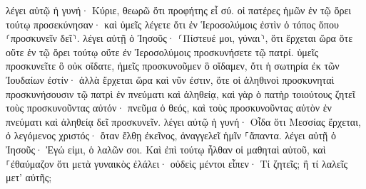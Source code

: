 \documentclass{openreader}
\begin{document}
λέγει αὐτῷ ἡ γυνή· Κύριε, θεωρῶ ὅτι προφήτης εἶ σύ. 
οἱ πατέρες ἡμῶν ἐν τῷ ὄρει τούτῳ προσεκύνησαν· καὶ ὑμεῖς λέγετε ὅτι ἐν Ἱεροσολύμοις ἐστὶν ὁ τόπος ὅπου ⸂προσκυνεῖν δεῖ⸃. 
λέγει αὐτῇ ὁ Ἰησοῦς· ⸂Πίστευέ μοι, γύναι⸃, ὅτι ἔρχεται ὥρα ὅτε οὔτε ἐν τῷ ὄρει τούτῳ οὔτε ἐν Ἱεροσολύμοις προσκυνήσετε τῷ πατρί. 
ὑμεῖς προσκυνεῖτε ὃ οὐκ οἴδατε, ἡμεῖς προσκυνοῦμεν ὃ οἴδαμεν, ὅτι ἡ σωτηρία ἐκ τῶν Ἰουδαίων ἐστίν· 
ἀλλὰ ἔρχεται ὥρα καὶ νῦν ἐστιν, ὅτε οἱ ἀληθινοὶ προσκυνηταὶ προσκυνήσουσιν τῷ πατρὶ ἐν πνεύματι καὶ ἀληθείᾳ, καὶ γὰρ ὁ πατὴρ τοιούτους ζητεῖ τοὺς προσκυνοῦντας αὐτόν· 
πνεῦμα ὁ θεός, καὶ τοὺς προσκυνοῦντας αὐτὸν ἐν πνεύματι καὶ ἀληθείᾳ δεῖ προσκυνεῖν. 
λέγει αὐτῷ ἡ γυνή· Οἶδα ὅτι Μεσσίας ἔρχεται, ὁ λεγόμενος χριστός· ὅταν ἔλθῃ ἐκεῖνος, ἀναγγελεῖ ἡμῖν ⸀ἅπαντα. 
λέγει αὐτῇ ὁ Ἰησοῦς· Ἐγώ εἰμι, ὁ λαλῶν σοι. 
Καὶ ἐπὶ τούτῳ ἦλθαν οἱ μαθηταὶ αὐτοῦ, καὶ ⸀ἐθαύμαζον ὅτι μετὰ γυναικὸς ἐλάλει· οὐδεὶς μέντοι εἶπεν· Τί ζητεῖς; ἢ τί λαλεῖς μετ’ αὐτῆς; 
\end{document}
